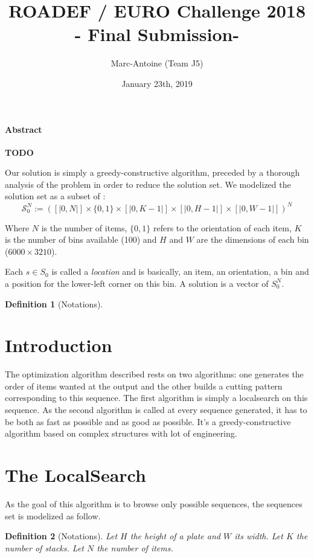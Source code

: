 \documentclass{article}
\title{ROADEF / EURO Challenge 2018 \\
    - Final Submission-}
\date{January 23th, 2019}
\author{Marc-Antoine \bsc{Augé} (Team J5)}
\newtheorem{definition}{Definition}
\begin{document}
        \maketitle

\paragraph{Abstract} \textbf{TODO}


Our solution is simply a greedy-constructive algorithm, preceded by a thorough analysis of the problem in order to reduce the solution set. We modelized the solution set as a subset of :
\[ \mathcal{S}_0^N := ([|0, N|]\times\{0,1\}\times[|0, K - 1|]\times[|0, H - 1|]\times[|0, W - 1|])^N\]

Where $N$ is the number of items, $\{0, 1\}$ refers to the orientation of each item, $K$ is the number of bins available (100) and $H$ and $W$ are the dimensions of each bin ($6000\times 3210$). 


Each $s \in S_0$ is called a \textit{location} and is basically, an item, an orientation, a bin and a position for the lower-left corner on this bin. A solution is a vector of $S_0^N$. 
\begin{definition}[Notations]
    
\end{definition}

\section{Introduction}

The optimization algorithm described rests on two algorithms: one generates the order of items wanted at the output and the other builds a cutting pattern corresponding to this sequence. The first algorithm is simply a localsearch on this sequence. As the second algorithm is called at every sequence generated, it has to be both as fast as possible and as good as possible. It's a greedy-constructive algorithm based on complex structures with lot of engineering.

\section{The LocalSearch}

As the goal of this algorithm is to browse only possible sequences, the sequences set is modelized as follow. 

\begin{definition}[Notations]
    Let $H$ the height of a plate and $W$ its width. 
    Let $K$ the number of stacks. 
    Let $N$ the number of items.
\end{definition}
\end{document}
